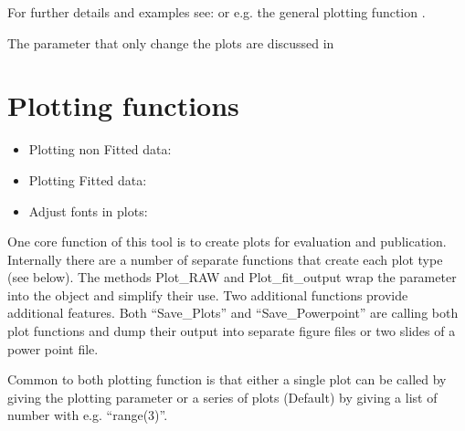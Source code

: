 \documentclass[letterpaper,10pt,english]{sphinxmanual}
\begin{document}
For further details and examples see: {\hyperref[\detokenize{plot_func:plot_func.TA.__make_standard_parameter}]{}}
or e.g. the general plotting function {\hyperref[\detokenize{plot_func:plot_func.plot_raw}]{}}.

The parameter that only change the plots are discussed in {\hyperref[\detokenize{Plotting:plot-shaping-options-without-influence-on-the-fitting}]{}}


\chapter{Plotting functions}
\label{\detokenize{Plotting:plotting-functions}}\label{\detokenize{Plotting::doc}}\begin{itemize}
\item {} 
Plotting non Fitted data:     {\hyperref[\detokenize{plot_func:plot_func.TA.Plot_RAW}]{}}

\item {} 
Plotting Fitted data:         {\hyperref[\detokenize{plot_func:plot_func.TA.Plot_fit_output}]{}}

\item {} 
Adjust fonts in plots:                {\hyperref[\detokenize{plot_func:plot_func.changefonts}]{}}

\end{itemize}

One core function of this tool is to create plots for evaluation and
publication. Internally there are a number of separate functions that
create each plot type (see below). The methods Plot\_RAW and Plot\_fit\_output
wrap the parameter into the object and simplify their use. Two additional functions
provide additional features. Both “Save\_Plots” and “Save\_Powerpoint” are
calling both plot functions and dump their output into separate figure files or two
slides of a power point file.

Common to both plotting function is that either a single plot can be called by giving
the plotting parameter or a series of plots (Default) by giving a list of number with
e.g. “range(3)”.
\end{document}
